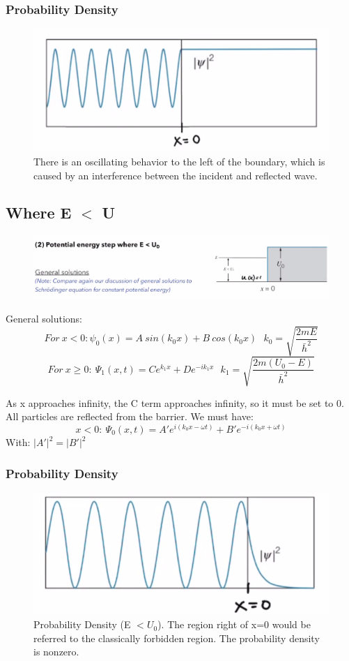 \documentclass[class=article,crop=false]{standalone}
\begin{document}
\subsubsection{Probability Density}

\begin{figure}[h!]
	\centering
	\includegraphics[width=0.6\linewidth]{./Images/probability_density.png}
	\caption{There is an oscillating behavior to the left of the boundary, which is caused by an interference between the incident and reflected wave.}
\end{figure}

\subsection{Where E $<$ U}

\begin{figure}[h!]
	\centering
	\includegraphics[width=1\linewidth]{./Images/pot_step2.png}
	\caption{}
\end{figure}

General solutions:
$$ For\ x<0: \psi_0(x) = A\ sin(k_0x) + B\ cos(k_0x)\ \ \ k_0 = \sqrt{\frac{2mE}{\bar{h}^2}} $$
$$ For\ x \geq 0:\ \Psi_1(x,t) = Ce^{k_1x} + De^{-ik_1x} \ \ \ k_1 =\sqrt{\frac{2m(U_0 - E)}{\bar{h}^2}} $$

As x approaches infinity, the C term approaches infinity, so it must be set to 0. \\

All particles are reflected from the barrier. We must have:
$$ x < 0:\ \Psi_0(x,t) = A'e^{i(k_0x-\omega t)} + B'e^{-i(k_0x+\omega t)} $$
With: $|A'|^2 = |B'|^2$

\subsubsection{Probability Density}
\begin{figure}[h!]
	\centering
	\includegraphics[width=0.6\linewidth]{./Images/pd_e_less_u.png}
	\caption{Probability Density (E $< U_0$). The region right of x=0 would be referred to the classically forbidden region. The probability density is nonzero.}
\end{figure}
\end{document}
